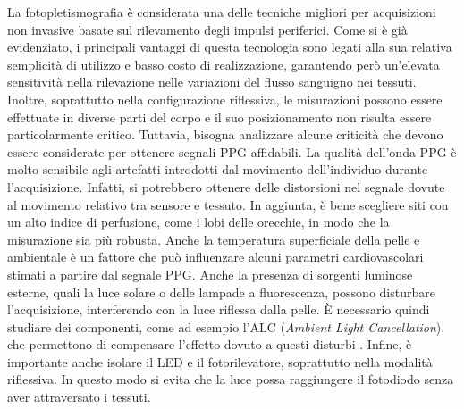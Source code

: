 La fotopletismografia è considerata una delle tecniche migliori per acquisizioni non invasive basate sul rilevamento degli impulsi periferici\cite{Nenova2009}. Come si è già evidenziato, i principali vantaggi di questa tecnologia sono legati alla sua relativa semplicità di utilizzo e basso costo di realizzazione, garantendo però un'elevata sensitività nella rilevazione nelle variazioni del flusso sanguigno nei tessuti. Inoltre, soprattutto nella configurazione riflessiva, le misurazioni possono essere effettuate in diverse parti del corpo e il suo posizionamento non risulta essere particolarmente critico. Tuttavia, bisogna analizzare alcune criticità che devono essere considerate per ottenere segnali PPG affidabili. La qualità dell'onda PPG è molto sensibile agli artefatti introdotti dal movimento dell'individuo durante l'acquisizione. Infatti, si potrebbero ottenere delle distorsioni nel segnale dovute al movimento relativo tra sensore e tessuto. In aggiunta, è bene scegliere siti con un alto indice di perfusione, come i lobi delle orecchie, in modo che la misurazione sia più robusta. Anche la temperatura superficiale della pelle e ambientale è un fattore che può influenzare alcuni parametri cardiovascolari stimati a partire dal segnale PPG\cite{Jeong2014}. Anche la presenza di sorgenti luminose esterne, quali la luce solare o delle lampade a fluorescenza, possono disturbare l'acquisizione, interferendo con la luce riflessa dalla pelle. \`E necessario quindi studiare dei componenti, come ad esempio l'ALC (\textit{Ambient Light Cancellation}), che permettono di compensare l'effetto dovuto a questi disturbi \cite{Kim2015}. Infine, è importante anche isolare il LED e il fotorilevatore, soprattutto nella modalità riflessiva. In questo modo si evita che la luce possa raggiungere il fotodiodo senza aver attraversato i tessuti.

\pagebreak